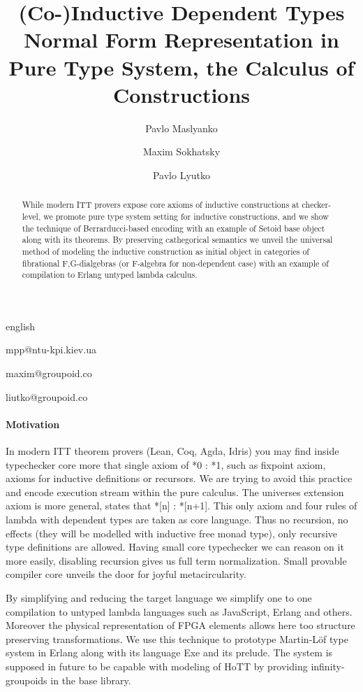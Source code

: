 \documentclass{abstract}
\begin{document}
\begin{theses}{english}

\title{(Co-)Inductive Dependent Types Normal Form Representation in Pure Type System, the Calculus of Constructions}
\author[1]{Pavlo Maslyanko}{mpp@ntu-kpi.kiev.ua}
\author[2]{Maxim Sokhatsky}{maxim@groupoid.co}
\author[3]{Pavlo Lyutko}{liutko@groupoid.co}
\maketitle

\begin{abstract}
While modern ITT provers expose core axioms of inductive constructions at checker-level,
we promote pure type system setting for inductive constructions, and we show the
technique of Berrarducci-based encoding with an example of Setoid base object along with its theorems.
By preserving cathegorical semantics we unveil the universal method of modeling the
inductive construction as initial object in categories of fibrational F,G-dialgebras (or F-algebra
for non-dependent case) with an example of compilation to Erlang untyped lambda calculus.
\end{abstract}

\paragraph{Motivation}

In modern ITT theorem provers (Lean, Coq, Agda, Idris) you may find inside typechecker core more that
single axiom of *0 : *1, such as fixpoint axiom, axioms for inductive definitions or recursors.
We are trying to avoid this practice and encode execution stream within the pure calculus.
The universes extension axiom is more general, states that *[n] : *[n+1]. This only axiom and four
rules of lambda with dependent types are taken as core language. Thus no recursion,
no effects (they will be modelled with inductive free monad type), only recursive type definitions are allowed.
Having small core typechecker we can reason on it more easily, disabling recursion gives
us full term normalization. Small provable compiler core unveils the door for joyful metacircularity.

By simplifying and reducing the target language we simplify one to one compilation to untyped
lambda languages such as JavaScript, Erlang and others. Moreover the physical representation
of FPGA elements allows here too structure preserving transformations. We use this technique to prototype
 Martin-Löf type system in Erlang along with its language Exe and its prelude.
The system is supposed in future to be capable with modeling of HoTT by providing infinity-groupoids in the base library.


\end{theses}
\end{document}
